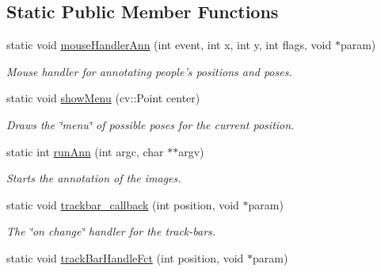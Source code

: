 \subsection*{Static Public Member Functions}
\begin{DoxyCompactItemize}
\item 
\hypertarget{classannotationsHandle_a2c3529417ce5c15e00e8bd8679a4db27}{
static void \hyperlink{classannotationsHandle_a2c3529417ce5c15e00e8bd8679a4db27}{mouseHandlerAnn} (int event, int x, int y, int flags, void $\ast$param)}
\label{classannotationsHandle_a2c3529417ce5c15e00e8bd8679a4db27}

\begin{DoxyCompactList}\small\item\em Mouse handler for annotating people's positions and poses. \item\end{DoxyCompactList}\item 
\hypertarget{classannotationsHandle_a2510d1948d3138df3331c91ddcd49b95}{
static void \hyperlink{classannotationsHandle_a2510d1948d3138df3331c91ddcd49b95}{showMenu} (cv::Point center)}
\label{classannotationsHandle_a2510d1948d3138df3331c91ddcd49b95}

\begin{DoxyCompactList}\small\item\em Draws the \char`\"{}menu\char`\"{} of possible poses for the current position. \item\end{DoxyCompactList}\item 
static int \hyperlink{classannotationsHandle_a226e4ef5f47790d98002d2567659a62e}{runAnn} (int argc, char $\ast$$\ast$argv)
\begin{DoxyCompactList}\small\item\em Starts the annotation of the images. \item\end{DoxyCompactList}\item 
\hypertarget{classannotationsHandle_ac8d0365f010294def2757bf31ba1207f}{
static void \hyperlink{classannotationsHandle_ac8d0365f010294def2757bf31ba1207f}{trackbar\_\-callback} (int position, void $\ast$param)}
\label{classannotationsHandle_ac8d0365f010294def2757bf31ba1207f}

\begin{DoxyCompactList}\small\item\em The \char`\"{}on change\char`\"{} handler for the track-\/bars. \item\end{DoxyCompactList}\item 
\hypertarget{classannotationsHandle_a6449c025574a5b0aae30a9b38fe598d6}{
static void \hyperlink{classannotationsHandle_a6449c025574a5b0aae30a9b38fe598d6}{trackBarHandleFct} (int position, void $\ast$param)}
\label{classannotationsHandle_a6449c025574a5b0aae30a9b38fe598d6}


\end{DoxyCompactItemize}
